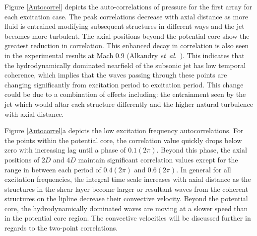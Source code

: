 \documentclass[english]{aiaa-tc}
\newcommand*{\etal}{\textit{et~al}.\ }
\begin{document}
Figure \ref{Autocorrel} depicts the auto-correlations of pressure for the first array for each excitation case. The peak correlations decrease with axial distance as more fluid is entrained modifying subsequent structures in different ways and the jet becomes more turbulent. The axial positions beyond the potential core show the greatest reduction in correlation. This enhanced decay in correlation is also seen in the experimental results at Mach $0.9$ (Alkandry \etal \cite{Alkandry2013}). This indicates that the hydrodynamically dominated nearfield of the subsonic jet has low temporal coherence, which implies that the waves passing through these points are changing significantly from excitation period to excitation period. This change could be due to a combination of effects including: the entrainment seen by the jet which would altar each structure differently and the higher natural turbulence with axial distance.

Figure \ref{Autocorrel}a depicts the low excitation frequency autocorrelations. For the points within the potential core, the correlation value quickly drops below zero with increasing lag until a phase of $0.1(2\pi)$. Beyond this phase, the axial positions of $2D$ and $4D$ maintain significant correlation values except for the range in between each period of $0.4(2\pi)$ and $0.6(2\pi)$. In general for all excitation frequencies, the integral time scale increases with axial distance as the structures in the shear layer become larger  or resultant waves from the coherent structures on the lipline decrease their convective velocity. Beyond the potential core, the hydrodynamically dominated waves are moving at a slower speed than in the potential core region. The convective velocities will be discussed further in regards to the two-point correlations.
\end{document}
